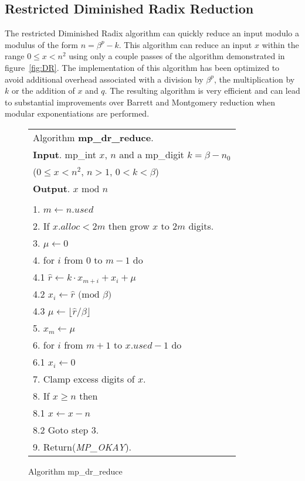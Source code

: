 \documentclass[b5paper]{book}
\begin{document}
\subsection{Restricted Diminished Radix Reduction}
The restricted Diminished Radix algorithm can quickly reduce an input modulo a modulus of the form $n = \beta^p - k$.  This algorithm can reduce 
an input $x$ within the range $0 \le x < n^2$ using only a couple passes of the algorithm demonstrated in figure~\ref{fig:DR}.  The implementation
of this algorithm has been optimized to avoid additional overhead associated with a division by $\beta^p$, the multiplication by $k$ or the addition 
of $x$ and $q$.  The resulting algorithm is very efficient and can lead to substantial improvements over Barrett and Montgomery reduction when modular 
exponentiations are performed.

\newpage\begin{figure}[!here]
\begin{small}
\begin{center}
\begin{tabular}{l}
\hline Algorithm \textbf{mp\_dr\_reduce}. \\
\textbf{Input}.   mp\_int $x$, $n$ and a mp\_digit $k = \beta - n_0$ \\
\hspace{11.5mm}($0 \le x < n^2$, $n > 1$, $0 < k < \beta$) \\
\textbf{Output}.  $x \mbox{ mod } n$ \\
\hline \\
1.  $m \leftarrow n.used$ \\
2.  If $x.alloc < 2m$ then grow $x$ to $2m$ digits. \\
3.  $\mu \leftarrow 0$ \\
4.  for $i$ from $0$ to $m - 1$ do \\
\hspace{3mm}4.1  $\hat r \leftarrow k \cdot x_{m+i} + x_{i} + \mu$ \\
\hspace{3mm}4.2  $x_{i} \leftarrow \hat r \mbox{ (mod }\beta\mbox{)}$ \\
\hspace{3mm}4.3  $\mu \leftarrow \lfloor \hat r / \beta \rfloor$ \\
5.  $x_{m} \leftarrow \mu$ \\
6.  for $i$ from $m + 1$ to $x.used - 1$ do \\
\hspace{3mm}6.1  $x_{i} \leftarrow 0$ \\
7.  Clamp excess digits of $x$. \\
8.  If $x \ge n$ then \\
\hspace{3mm}8.1  $x \leftarrow x - n$ \\
\hspace{3mm}8.2  Goto step 3. \\
9.  Return(\textit{MP\_OKAY}). \\
\hline
\end{tabular}
\end{center}
\end{small}
\caption{Algorithm mp\_dr\_reduce}
\end{figure}
\end{document}
